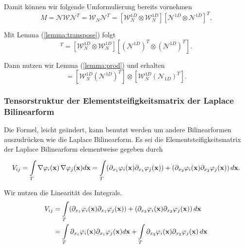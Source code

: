 Damit können wir folgende Umformulierung bereits vornehmen
\begin{equation}
M= \mathcal{N} \mathcal{W} \mathcal{N}^T= \mathcal{W}_N \mathcal{N}^T =  [\mathcal{W}_N^{1D} \otimes \mathcal{W}_N^{1D}]  [\mathcal{N}^{1D} \otimes \mathcal{N}^{1D}]^T.
\end{equation}

Mit Lemma (\ref{lemma:transpose}) folgt
\begin{equation*}
[\mathcal{W}_N^{1D} \otimes \mathcal{W}_N^{1D}] [\mathcal{N}^{1D} \otimes \mathcal{N}^{1D}]^T=
[\mathcal{W}_N^{1D} \otimes \mathcal{W}_N^{1D}]  [(\mathcal{N}^{1D})^T \otimes (\mathcal{N}^{1D})^T].
\end{equation*}

Dann nutzen wir Lemma (\ref{lemma:prod}) und erhalten
\begin{equation}
 [\mathcal{W}_N^{1D} \otimes \mathcal{W}_N^{1D}]  [(\mathcal{N}^{1D})^T \otimes (\mathcal{N}_{1D})^T]= [\mathcal{W}_N^{1D} (\mathcal{N}^{1D})^T] \otimes [\mathcal{W}_N^{1D} (\mathcal{N}_{1D})^T].
\end{equation}

\newpage
\subsubsection{Tensorstruktur der Elementsteifigkeitsmatrix der Laplace Bilinearform}
Die Formel, leicht geändert, kann benutzt werden um andere Bilinearformen auszudrücken wie die Laplace Bilinearform. Es sei die Elementsteifigkeitsmatrix der Laplace Bilinearform elementweise gegeben durch

\begin{equation}
V_{ij} = \int\limits_{T} \nabla \varphi_i(\bold{x}) \, \nabla \varphi_j(\bold{x})  d \bold{x}=\int\limits_{T}( \partial_{x_1}  \varphi_i(\bold{x})  \partial_{x_1} \varphi_j(\bold{x})) + ( \partial_{x_2} \varphi_i(\bold{x})  \partial_{x_2} \varphi_j(\bold{x})) \, d\bold{x}.
\end{equation}

Wir nutzen die Linearität des Integrals.
\begin{equation}
\begin{aligned}
V_{ij} &= \int\limits_{T}( \partial_{x_1}  \varphi_i(\bold{x})  \partial_{x_1} \varphi_j(\bold{x})) + ( \partial_{x_2} \varphi_i(\bold{x})  \partial_{x_2} \varphi_j(\bold{x})) \, d\bold{x} \\ &= \int\limits_{T} \partial_{x_1}  \varphi_i(\bold{x})  \partial_{x_1} \varphi_j(\bold{x}) d\bold{x} + \int\limits_{T}  \partial_{x_2} \varphi_i(\bold{x})  \partial_{x_2} \varphi_j(\bold{x}) \, d\bold{x}
\end{aligned}
\end{equation}

